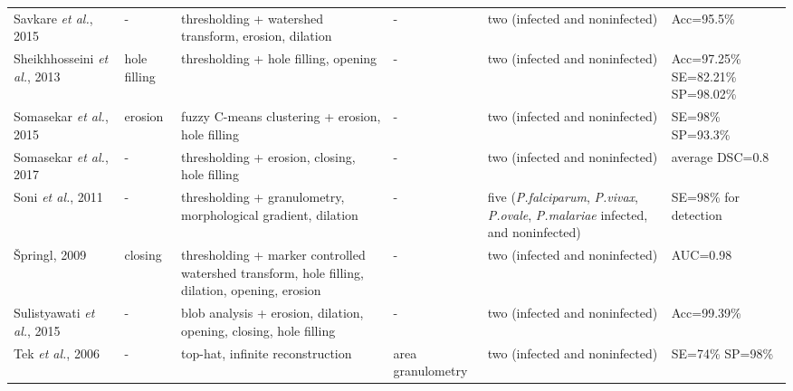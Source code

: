 \begin{longtable}{C{2.1cm} C{2.1cm} C{2.3cm} C{1.5cm} C{2.7cm} C{2.2cm} }
    Savkare \emph{et al.}, 2015  &
    	- &
    	thresholding + watershed transform, erosion, dilation  &
    	- &
    	two (infected and noninfected) &
    	Acc=95.5\% \vspace{0.6cm} \\

    Sheikhhosseini \emph{et al.}, 2013  &
    	hole filling &
    	thresholding + hole filling, opening  &
    	- &
    	two (infected and noninfected) &
    	Acc=97.25\% SE=82.21\% SP=98.02\% \vspace{0.6cm} \\

    Somasekar \emph{et al.}, 2015  &
    	erosion &
    	fuzzy C-means clustering + erosion, hole filling  &
    	- &
    	two (infected and noninfected) &
    	SE=98\% SP=93.3\% \vspace{0.6cm} \\

    Somasekar \emph{et al.}, 2017  &
    	- &
    	thresholding + erosion, closing, hole filling  &
    	- &
    	two (infected and noninfected) &
    	average DSC=0.8 \vspace{0.6cm} \\

    Soni \emph{et al.}, 2011  &
    	- &
    	thresholding + granulometry, morphological gradient, dilation  &
    	- &
    	five (\emph{P.falciparum}, \emph{P.vivax}, \emph{P.ovale}, \emph{P.malariae} infected, and noninfected) &
    	SE=98\% for detection  \vspace{0.6cm} \\

{\v{S}}pringl, 2009  &
    	closing &
    	thresholding + marker controlled watershed transform, hole filling, dilation, opening, erosion  &
    	- &
    	two (infected and noninfected) &
    	AUC=0.98 \vspace{0.6cm} \\

    Sulistyawati \emph{et al.}, 2015  &
    	- &
    	blob analysis + erosion, dilation, opening, closing, hole filling  &
    	- &
    	two (infected and noninfected) &
    	Acc=99.39\% \vspace{0.6cm} \\

 Tek \emph{et al.}, 2006  &
    	- &
    	top-hat, infinite reconstruction  &
    	area granulometry &
    	two (infected and noninfected) &
    	SE=74\% SP=98\% \vspace{0.6cm} \\


\end{longtable}
